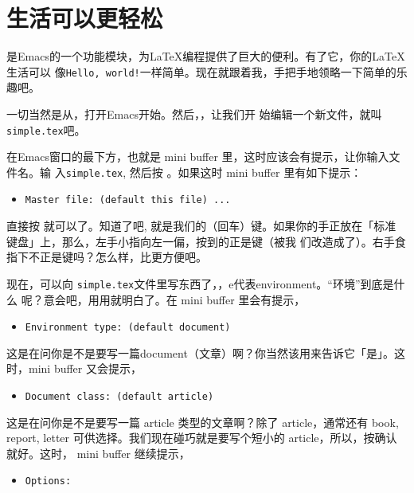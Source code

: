 \section{生活可以更轻松}

\auctex{}是Emacs的一个功能模块，为\LaTeX{}编程提供了巨大的便利。有了它，你的\LaTeX{}生活可以
像\texttt{Hello, world!}一样简单。现在就跟着我，手把手地领略一下简单的乐趣吧。

一切当然是从，打开Emacs开始。然后，，让我们开
始编辑一个新文件，就叫 \texttt{simple.tex}吧。

在Emacs窗口的最下方，也就是 mini buffer 里，这时应该会有提示，让你输入文件名。输
入\texttt{simple.tex}, 然后按 。如果这时 mini buffer 里有如下提示：

\begin{itemize}
\item[] \texttt{Master file: (default this file) ...}
\end{itemize}

直接按  就可以了。知道了吧,  就是我们的\LKeyEnter{}（回车）键。如果你的手正放在「标准
键盘」上，那么，左手小指向左一偏，按到的正是\LKeyCtrl{}键（被我
们改造成\LKeyCtrl{}了）。右手食指下不正是键吗？怎么样，比\LKeyEnter{}更方便吧。

现在，可以向 \texttt{simple.tex}文件里写东西了，，e代表environment。“环境”到底是什么
呢？意会吧，用用就明白了。在 mini buffer 里会有提示，

\begin{itemize}
\item[] \texttt{Environment type: (default document)}
\end{itemize}

这是在问你是不是要写一篇document（文章）啊？你当然该用来告诉它「是」。这时，mini buffer 又会提示，

\begin{itemize}
\item[] \texttt{Document class: (default article)}
\end{itemize}

这是在问你是不是要写一篇 article 类型的文章啊？除了 article，通常还有 book, report, letter
可供选择。我们现在碰巧就是要写个短小的 article，所以，按确认就好。这时， mini buffer 继续提示，

\begin{itemize}
\item[] \texttt{Options:}
\end{itemize}

